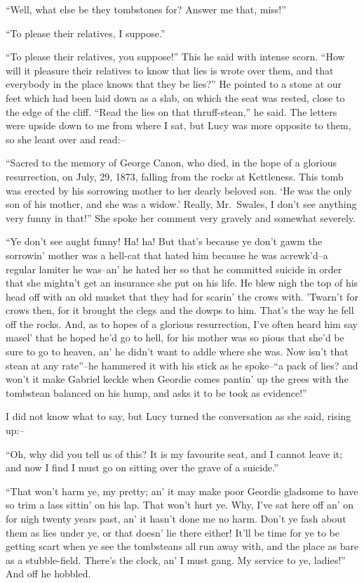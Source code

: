 \documentclass[12pt,openright]{book}
\begin{document}
“Well, what else be they tombstones for? Answer me that, miss!”

“To please their relatives, I suppose.”

“To please their relatives, you suppose!” This he said with intense scorn. “How will it pleasure their relatives to know that lies is wrote over them, and that everybody in the place knows that they be lies?” He pointed to a stone at our feet which had been laid down as a slab, on which the seat was rested, close to the edge of the cliff. “Read the lies on that thruff-stean,” he said. The letters were upside down to me from where I sat, but Lucy was more opposite to them, so she leant over and read:–

“Sacred to the memory of George Canon, who died, in the hope of a glorious resurrection, on July, 29, 1873, falling from the rocks at Kettleness. This tomb was erected by his sorrowing mother to her dearly beloved son. ‘He was the only son of his mother, and she was a widow.’ Really, Mr. Swales, I don’t see anything very funny in that!” She spoke her comment very gravely and somewhat severely.

“Ye don’t see aught funny! Ha! ha! But that’s because ye don’t gawm the sorrowin’ mother was a hell-cat that hated him because he was acrewk’d–a regular lamiter he was–an’ he hated her so that he committed suicide in order that she mightn’t get an insurance she put on his life. He blew nigh the top of his head off with an old musket that they had for scarin’ the crows with. ’Twarn’t for crows then, for it brought the clegs and the dowps to him. That’s the way he fell off the rocks. And, as to hopes of a glorious resurrection, I’ve often heard him say masel’ that he hoped he’d go to hell, for his mother was so pious that she’d be sure to go to heaven, an’ he didn’t want to addle where she was. Now isn’t that stean at any rate”–he hammered it with his stick as he spoke–“a pack of lies? and won’t it make Gabriel keckle when Geordie comes pantin’ up the grees with the tombstean balanced on his hump, and asks it to be took as evidence!”

I did not know what to say, but Lucy turned the conversation as she said, rising up:–

“Oh, why did you tell us of this? It is my favourite seat, and I cannot leave it; and now I find I must go on sitting over the grave of a suicide.”

“That won’t harm ye, my pretty; an’ it may make poor Geordie gladsome to have so trim a lass sittin’ on his lap. That won’t hurt ye. Why, I’ve sat here off an’ on for nigh twenty years past, an’ it hasn’t done me no harm. Don’t ye fash about them as lies under ye, or that doesn’ lie there either! It’ll be time for ye to be getting scart when ye see the tombsteans all run away with, and the place as bare as a stubble-field. There’s the clock, an’ I must gang. My service to ye, ladies!” And off he hobbled.
\end{document}
